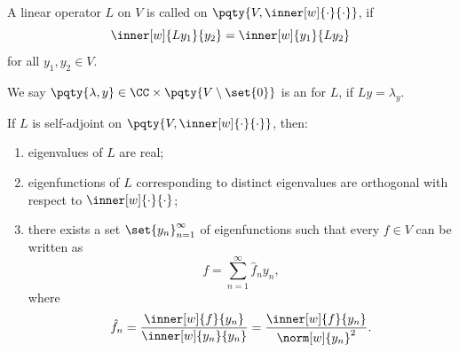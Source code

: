 \begin{definition}
    A linear operator \(L\) on \(V\) is called  on \(\pqty{V, \inner[w]{\cdot}{\cdot}}\), if
    \begin{equation}
        \inner[w]{L y_1}{y_2} = \inner[w]{y_1}{L y_2}
    \end{equation}
    for all \(y_1, y_2 \in V\).
\end{definition}

We say \(\pqty{\lambda, y} \in \CC \times \pqty{V \setminus \set{0}}\) is an  for \(L\), if \(Ly = \lambda_y\).

\begin{proposition}
    If \(L\) is self-adjoint on \(\pqty{V, \inner[w]{\cdot}{\cdot}}\), then:
    \begin{enumerate}[label=(\roman*)]
        \item eigenvalues of \(L\) are real;
        \item eigenfunctions of \(L\) corresponding to distinct eigenvalues are orthogonal with respect to \(\inner[w]{\cdot}{\cdot}\);
        \item there exists a set \(\set{y_n}_{n = 1}^{\infty}\) of eigenfunctions such that every \(f \in V\) can be written as
        \begin{equation}
            f = \sum_{n = 1}^{\infty} \hat{f}_n y_n,
        \end{equation}
        where
        \begin{equation}
            \hat{f}_n = \frac{\inner[w]{f}{y_n}}{\inner[w]{y_n}{y_n}} = \frac{\inner[w]{f}{y_n}}{\norm[w]{y_n}^2}.
        \end{equation}
    \end{enumerate}
\end{proposition}


